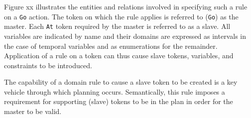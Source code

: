 \begin{description}

  Figure xx illustrates the entities and relations involved in
  specifying such a rule on a \texttt{Go} action. The token on which
  the rule applies is referred to (\texttt{Go}) as the master. Each
  \texttt{At} token required by the master is referred to as a
  slave. All variables are indicated by name and their domains are
  expressed as intervals in the case of temporal variables and as
  enumerations for the remainder. Application of a rule on a token can
  thus cause slave tokens, variables, and constraints to be
  introduced.

  The capability of a domain rule to cause a slave token to be created
  is a key vehicle through which planning occurs. Semantically, this
  rule imposes a requirement for supporting (slave) tokens to be in
  the plan in order for the master to be valid.


\end{description}


